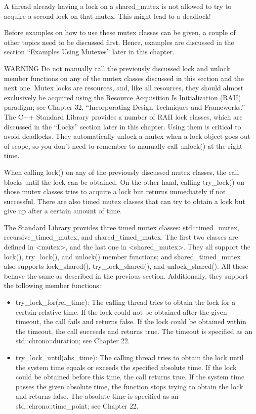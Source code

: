A thread already having a lock on a shared\_mutex is not allowed to try to acquire a second lock on that mutex. This might lead to a deadlock!

Before examples on how to use these mutex classes can be given, a couple of other topics need to be discussed first. Hence, examples are discussed in the section “Examples Using Mutexes” later in this chapter.

\begin{myWarning}{WARNING}
Do not manually call the previously discussed lock and unlock member functions on any of the mutex classes discussed in this section and the next one. Mutex locks are resources, and, like all resources, they should almost exclusively be acquired using the Resource Acquisition Is Initialization (RAII) paradigm; see Chapter 32, “Incorporating Design Techniques and Frameworks.” The C++ Standard Library provides a number of RAII lock classes, which are discussed in the “Locks” section later in this chapter. Using them is critical to avoid deadlocks. They automatically unlock a mutex when a lock object goes out of scope, so you don’t need to remember to manually call unlock() at the right time.
\end{myWarning}


When calling lock() on any of the previously discussed mutex classes, the call blocks until the lock can be obtained. On the other hand, calling try\_lock() on those mutex classes tries to acquire a lock but returns immediately if not successful. There are also timed mutex classes that can try to obtain a lock but give up after a certain amount of time.

The Standard Library provides three timed mutex classes: std::timed\_mutex, recursive\_timed\_mutex, and shared\_timed\_mutex. The first two classes are defined in <mutex>, and the last one in <shared\_mutex>. They all support the lock(), try\_lock(), and unlock() member functions; and shared\_timed\_mutex also supports lock\_shared(), try\_lock\_shared(), and unlock\_shared(). All these behave the same as described in the previous section. Additionally, they support the following member functions:

\begin{itemize}
\item
try\_lock\_for(rel\_time): The calling thread tries to obtain the lock for a certain relative time. If the lock could not be obtained after the given timeout, the call fails and returns false. If the lock could be obtained within the timeout, the call succeeds and returns true. The timeout is specified as an std::chrono::duration; see Chapter 22.

\item
try\_lock\_until(abs\_time): The calling thread tries to obtain the lock until the system time equals or exceeds the specified absolute time. If the lock could be obtained before this time, the call returns true. If the system time passes the given absolute time, the function stops trying to obtain the lock and returns false. The absolute time is specified as an std::chrono::time\_point; see Chapter 22.
\end{itemize}

